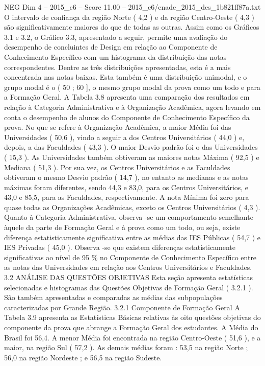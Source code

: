 \begin{textsample}{NEG Dim 4 – 2015\_c6 – Score 11.00 – 2015\_c6/enade\_2015\_des\_1b821ff87a.txt}
O intervalo de confiança da região Norte ( 4,2 ) e da região Centro-Oeste ( 4,3 ) são significativamente maiores do que de todas as outras.
Assim como os Gráficos 3.1 e 3.2, o Gráfico 3.3, apresentado a seguir, permite uma avaliação do desempenho de concluintes de Design em relação ao Componente de Conhecimento Específico com um histograma da distribuição das notas correspondentes.
Dentre as três distribuições apresentadas, esta é a mais concentrada nas notas baixas.
Esta também é uma distribuição unimodal, e o grupo modal é o ( 50 ; 60 ], o mesmo grupo modal da prova como um todo e para a Formação Geral.
A Tabela 3.8 apresenta uma comparação dos resultados em relação à Categoria Administrativa e à Organização Acadêmica, agora levando em conta o desempenho de alunos do Componente de Conhecimento Específico da prova.
No que se refere à Organização Acadêmica, a maior Média foi das Universidades ( 50,6 ), vindo a seguir a dos Centros Universitários ( 44,0 ) e, depois, a das Faculdades ( 43,3 ).
O maior Desvio padrão foi o das Universidades ( 15,3 ).
As Universidades também obtiveram as maiores notas Máxima ( 92,5 ) e Mediana ( 51,3 ).
Por sua vez, os Centros Universitários e as Faculdades obtiveram o mesmo Desvio padrão ( 14,7 ), no entanto as medianas e as notas máximas foram diferentes, sendo 44,3 e 83,0, para os Centros Universitários, e 43,0 e 85,5, para as Faculdades, respectivamente.
A nota Mínima foi zero para quase todas as Organizações Acadêmicas, exceto os Centros Universitários ( 4,3 ).
Quanto à Categoria Administrativa, observa -se um comportamento semelhante àquele da parte de Formação Geral e à prova como um todo, ou seja, existe diferença estatisticamente significativa entre as médias das IES Públicas ( 54,7 ) e IES Privadas ( 45,0 ).
Observa -se que existem diferenças estatisticamente significativas ao nível de 95 \% no Componente de Conhecimento Específico entre as notas das Universidades em relação aos Centros Universitários e Faculdades. 3.2 ANÁLISE DAS QUESTÕES OBJETIVAS Esta seção apresenta estatísticas selecionadas e histogramas das Questões Objetivas de Formação Geral ( 3.2.1 ).
São também apresentadas e comparadas as médias das subpopulações caracterizadas por Grande Região. 3.2.1 Componente de Formação Geral A Tabela 3.9 apresenta as Estatísticas Básicas relativas às oito questões objetivas do componente da prova que abrange a Formação Geral dos estudantes.
A Média do Brasil foi 56,4.
A menor Média foi encontrada na região Centro-Oeste ( 51,6 ), e a maior, na região Sul ( 57,2 ).
As demais médias foram : 53,5 na região Norte ; 56,0 na região Nordeste ; e 56,5 na região Sudeste.

\end{textsample}
